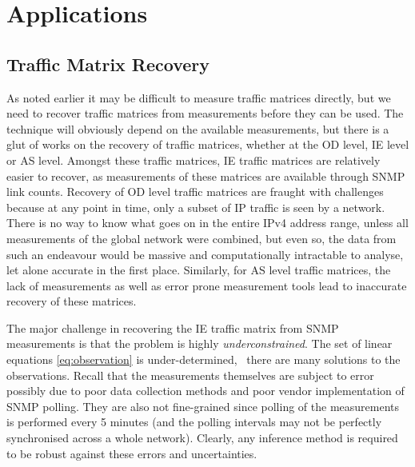 \section{Applications}
\label{sec:applications}

\subsection{Traffic Matrix Recovery}

As noted earlier it may be difficult to measure traffic matrices
directly, but we need to recover traffic matrices from measurements
before they can be used. The technique will obviously depend on the
available measurements, but there is a glut of works on the recovery
of traffic matrices, whether at the OD level, IE level or AS
level. Amongst these traffic matrices, IE traffic matrices are
relatively easier to recover, as measurements of these matrices are
available through SNMP link counts. Recovery of OD level traffic
matrices are fraught with challenges because at any point in time,
only a subset of IP traffic is seen by a network. There is no way to
know what goes on in the entire IPv4 address range, 
unless all measurements of the
global network were combined, but even so, the data from such an
endeavour would be massive and computationally intractable to
analyse, let alone accurate in the first place. Similarly, for AS level 
traffic matrices, the lack of measurements as well as error prone 
measurement tools lead to inaccurate recovery of these matrices.

The major challenge in recovering the IE traffic matrix from SNMP
measurements is that the problem is highly \emph{underconstrained}.
The set of linear equations \autoref{eq:observation} is
under-determined, \ie~there are many solutions to the
observations. Recall that the measurements themselves are subject to
error possibly due to poor data collection methods and poor vendor
implementation of SNMP polling.  They are also not fine-grained since
polling of the measurements is performed every 5 minutes (and the
polling intervals may not be perfectly synchronised across a whole
network). Clearly, any inference method is required to be robust
against these errors and uncertainties. 

